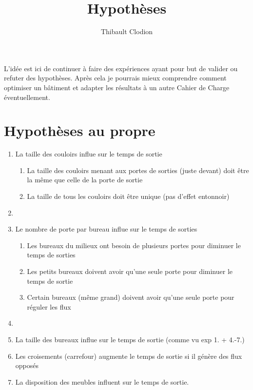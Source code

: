 \documentclass[12pt]{article}
\title{Hypothèses}
\author{Thibault Clodion}
\begin{document}
\maketitle %

L'idée est ici de continuer à faire des expériences ayant pour but de valider ou refuter des hypothèses.
Après cela je pourrais mieux comprendre comment optimiser un bâtiment et adapter les résultats à un autre Cahier de Charge éventuellement.

\section{Hypothèses au propre}

\begin{enumerate}
    \item La taille des couloirs influe sur le temps de sortie
    \begin{enumerate}
        \item La taille des couloirs menant aux portes de sorties (juste devant) doit être la même que celle de la porte de sortie
        \item La taille de tous les couloirs doit être unique (pas d'effet entonnoir)
    \end{enumerate}

    \item 
    
    \item Le nombre de porte par bureau influe sur le temps de sorties
    \begin{enumerate}
        \item Les bureaux du milieux ont besoin de plusieurs portes pour diminuer le temps de sorties
        \item Les petits bureaux doivent avoir qu'une seule porte pour diminuer le temps de sortie
        \item Certain bureaux (même grand) doivent avoir qu'une seule porte pour réguler les flux
    \end{enumerate}

    \item
    
    \item La taille des bureaux influe sur le temps de sortie (comme vu exp 1. + 4.-7.)
    
    \item Les croisements (carrefour) augmente le temps de sortie si il génère des flux opposés
    
    \item La disposition des meubles influent sur le temps de sortie.

\end{enumerate}
\end{document}
